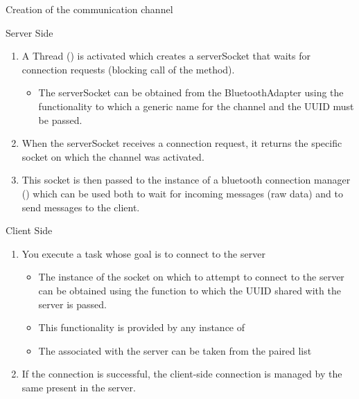 \documentclass{beamer}
\begin{document}
  \begin{frame}[allowframebreaks]{Creation of the communication channel}
    \begin{block}{Server Side}
      \begin{enumerate}
        \item A Thread () is activated which creates a
        serverSocket that waits for connection requests (blocking call of the
         method).
        \begin{itemize}
          \item The serverSocket can be obtained from the BluetoothAdapter using
          the  functionality to which a
          generic name for the channel and the UUID must be passed.
        \end{itemize}
        \item When the serverSocket receives a connection request, it returns
        the specific socket on which the channel was activated.
        \item This socket is then passed to the instance of a bluetooth
        connection manager () which can be used both to wait
        for incoming messages (raw data) and to send messages to the client. 
      \end{enumerate}
    \end{block}
    \begin{block}{Client Side}
      \begin{enumerate}
        \item You execute a task whose goal is to connect to the server
        \begin{itemize}
          \item The instance of the socket on which to attempt to connect to the
          server can be obtained using the
           function to which the UUID
          shared with the server is passed.         
          \item This functionality is provided by any instance of
          \item The  associated with the server can be
          taken from the paired list
        \end{itemize}
        \item If the connection is successful, the client-side connection is
        managed by the same  present in the server.
      \end{enumerate}
    \end{block}
  \end{frame}
\end{document}
